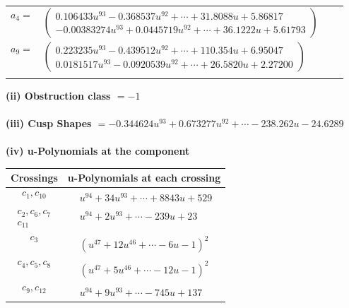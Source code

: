 \documentclass[1p]{elsarticle_modified}
\theoremstyle{definition}
\begin{document}
\begin{tabular}{m{7pt} m{180pt} m{7pt} m{180pt} }
\flushright $a_{4}=$&$\begin{pmatrix}0.106433 u^{93}-0.368537 u^{92}+\cdots+31.8088 u+5.86817\\-0.00383274 u^{93}+0.0445719 u^{92}+\cdots+36.1222 u+5.61793\end{pmatrix}$ \\
\flushright $a_{9}=$&$\begin{pmatrix}0.223235 u^{93}-0.439512 u^{92}+\cdots+110.354 u+6.95047\\0.0181517 u^{93}-0.0920539 u^{92}+\cdots+26.5820 u+2.27200\end{pmatrix}$\\&\end{tabular}
\flushleft \textbf{(ii) Obstruction class $= -1$}\\~\\
\flushleft \textbf{(iii) Cusp Shapes $= -0.344624 u^{93}+0.673277 u^{92}+\cdots-238.262 u-24.6289$}\\~\\
\newpage\renewcommand{\arraystretch}{1}
\flushleft \textbf{(iv) u-Polynomials at the component}\newline \\
\begin{tabular}{m{50pt}|m{274pt}}
Crossings & \hspace{64pt}u-Polynomials at each crossing \\
\hline $$\begin{aligned}c_{1},c_{10}\end{aligned}$$&$\begin{aligned}
&u^{94}+34 u^{93}+\cdots+8843 u+529
\end{aligned}$\\
\hline $$\begin{aligned}c_{2},c_{6},c_{7}\\c_{11}\end{aligned}$$&$\begin{aligned}
&u^{94}+2 u^{93}+\cdots-239 u+23
\end{aligned}$\\
\hline $$\begin{aligned}c_{3}\end{aligned}$$&$\begin{aligned}
&(u^{47}+12 u^{46}+\cdots-6 u-1)^{2}
\end{aligned}$\\
\hline $$\begin{aligned}c_{4},c_{5},c_{8}\end{aligned}$$&$\begin{aligned}
&(u^{47}+5 u^{46}+\cdots-12 u-1)^{2}
\end{aligned}$\\
\hline $$\begin{aligned}c_{9},c_{12}\end{aligned}$$&$\begin{aligned}
&u^{94}+9 u^{93}+\cdots-745 u+137
\end{aligned}$\\
\hline
\end{tabular}\\~\\
\end{document}
